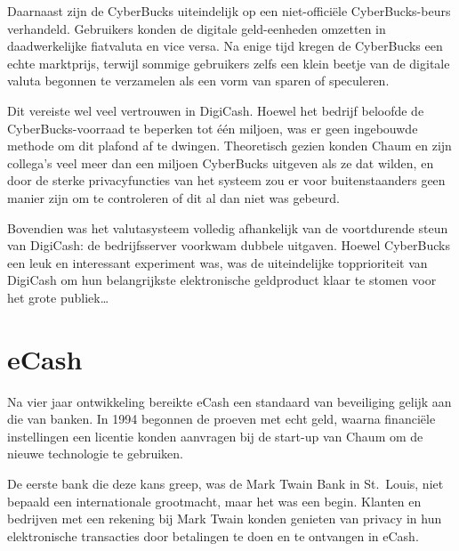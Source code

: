 \documentclass[
  a5paper,
  smalldemyvopaper,11pt,twoside,onecolumn,openright,extrafontsizes]{memoir}
\begin{document}
Daarnaast zijn de CyberBucks uiteindelijk op een niet-officiële
CyberBucks-beurs verhandeld. Gebruikers konden de digitale geld-eenheden
omzetten in daadwerkelijke fiatvaluta en vice versa. Na enige tijd
kregen de CyberBucks een echte marktprijs, terwijl sommige gebruikers
zelfs een klein beetje van de digitale valuta begonnen te verzamelen als
een vorm van sparen of speculeren.

Dit vereiste wel veel vertrouwen in DigiCash. Hoewel het bedrijf
beloofde de CyberBucks-voorraad te beperken tot één miljoen, was er geen
ingebouwde methode om dit plafond af te dwingen. Theoretisch gezien
konden Chaum en zijn collega's veel meer dan een miljoen CyberBucks
uitgeven als ze dat wilden, en door de sterke privacyfuncties van het
systeem zou er voor buitenstaanders geen manier zijn om te controleren
of dit al dan niet was gebeurd.

Bovendien was het valutasysteem volledig afhankelijk van de voortdurende
steun van DigiCash: de bedrijfsserver voorkwam dubbele uitgaven. Hoewel
CyberBucks een leuk en interessant experiment was, was de uiteindelijke
topprioriteit van DigiCash om hun belangrijkste elektronische
geldproduct klaar te stomen voor het grote publiek\ldots{}

\section{eCash}\label{ecash}

Na vier jaar ontwikkeling bereikte eCash een standaard van beveiliging
gelijk aan die van banken. In 1994 begonnen de proeven met echt geld,
waarna financiële instellingen een licentie konden aanvragen bij de
start-up van Chaum om de nieuwe technologie te gebruiken.

De eerste bank die deze kans greep, was de Mark Twain Bank in St.~Louis,
niet bepaald een internationale grootmacht, maar het was een begin.
Klanten en bedrijven met een rekening bij Mark Twain konden genieten van
privacy in hun elektronische transacties door betalingen te doen en te
ontvangen in eCash.
\end{document}
